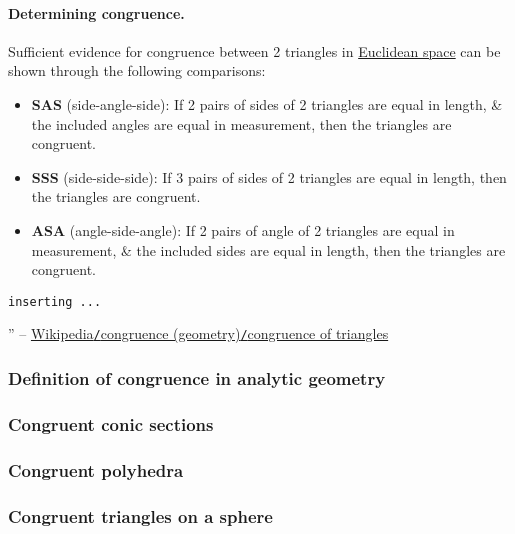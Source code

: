 \documentclass{article}
\begin{document}
\paragraph{Determining congruence.} Sufficient evidence for congruence between 2 triangles in \href{https://en.wikipedia.org/wiki/Euclidean_space}{Euclidean space} can be shown through the following comparisons:
\begin{itemize}
	\item \textbf{SAS} (side-angle-side): If 2 pairs of sides of 2 triangles are equal in length, \& the included angles are equal in measurement, then the triangles are congruent.
	\item \textbf{SSS} (side-side-side): If 3 pairs of sides of 2 triangles are equal in length, then the triangles are congruent.
	\item \textbf{ASA} (angle-side-angle): If 2 pairs of angle of 2 triangles are equal in measurement, \& the included sides are equal in length, then the triangles are congruent.
\end{itemize}
\texttt{inserting ...}

'' -- \href{https://en.wikipedia.org/wiki/Congruence_(geometry)#Congruence_of_triangles}{Wikipedia\texttt{/}congruence (geometry)\texttt{/}congruence of triangles}

\subsubsection{Definition of congruence in analytic geometry}

\subsubsection{Congruent conic sections}

\subsubsection{Congruent polyhedra}

\subsubsection{Congruent triangles on a sphere}

\end{document}
